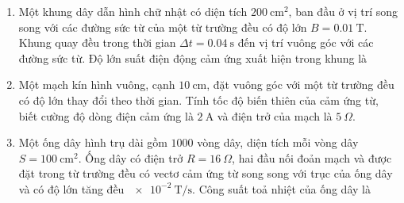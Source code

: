 \begin{enumerate}
{			
	}
	\item
	{
		Một khung dây dẫn hình chữ nhật có diện tích $\SI{200}{\centi \meter \squared}$, ban đầu ở vị trí song song với các đường sức từ của một từ trường đều có độ lớn $B=\SI{0.01}{\tesla}$. Khung quay đều trong thời gian $\Delta t= \SI{0.04}{\second}$ đến vị trí vuông góc với các đường sức từ. Độ lớn suất điện động cảm ứng xuất hiện trong khung là
	}
	\item
	{
		Một mạch kín hình vuông, cạnh $\SI{10}{\centi \meter}$, đặt vuông góc với một từ trường đều có độ lớn thay đổi theo thời gian. Tính tốc độ biến thiên của cảm ứng từ, biết cường độ dòng điện cảm ứng là $\SI{2}{\ampere}$ và điện trở của mạch là $\SI{5}{\Omega}$.
	}
	\item
	{
		Một ống dây hình trụ dài gồm $1000$ vòng dây, diện tích mỗi vòng dây $S=\SI{100}{\centi \meter \squared}$. Ống dây có điện trở $R=\SI{16}{\Omega}$, hai đầu nối đoản mạch và được đặt trong từ trường đều có vectơ cảm ứng từ song song với trục của ống dây và có độ lớn tăng đều $\SI{e-2}{\tesla / \second}$. Công suất toả nhiệt của ống dây là
		}
\end{enumerate}
